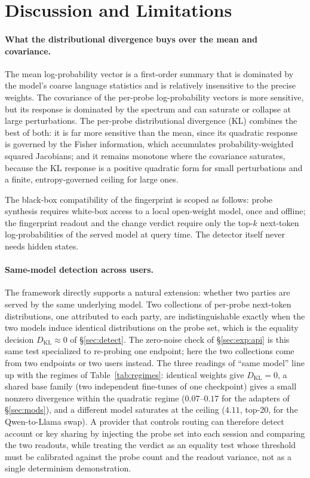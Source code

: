 \documentclass[11pt]{article}
\theoremstyle{definition}
\begin{document}
\section{Discussion and Limitations}
\label{sec:disc}

\paragraph{What the distributional divergence buys over the mean and covariance.}
The mean log-probability vector is a first-order summary that is dominated by
the model's coarse language statistics and is relatively insensitive to the
precise weights. The covariance of the per-probe log-probability vectors is
more sensitive, but its response is dominated by the spectrum and can saturate
or collapse at large perturbations. The per-probe distributional divergence
(KL) combines the best of both: it is far more sensitive than the mean, since its
quadratic response is governed by the Fisher information, which accumulates
probability-weighted squared Jacobians; and it
remains monotone where the covariance saturates, because the KL response is a
positive quadratic form for small perturbations and a finite, entropy-governed
ceiling for large ones.

The black-box compatibility of the fingerprint is scoped as follows: probe
synthesis requires white-box access to a local open-weight model, once and
offline; the fingerprint readout and the change verdict require only the top-$k$
next-token log-probabilities of the served model at query time. The detector
itself never needs hidden states.

\paragraph{Same-model detection across users.}
The framework directly supports a natural extension: whether two parties are
served by the same underlying model. Two collections of per-probe next-token
distributions, one attributed to each party, are indistinguishable exactly when
the two models induce identical distributions on the probe set, which is the
equality decision $D_{\mathrm{KL}} \approx 0$ of \S\ref{sec:detect}. The zero-noise check of
\S\ref{sec:exp:api} is this same test specialized to re-probing one endpoint;
here the two collections come from two endpoints or two users instead. The three
readings of ``same model'' line up with the regimes of
Table~\ref{tab:regimes}: identical weights give $D_{\mathrm{KL}} = 0$, a shared
base family (two independent fine-tunes of one checkpoint) gives a small nonzero
divergence within the quadratic regime ($0.07$--$0.17$ for the adapters of
\S\ref{sec:mods}), and a different model saturates at the ceiling ($4.11$,
top-20, for the Qwen-to-Llama swap). A provider that controls routing can
therefore detect account or key sharing by injecting the probe set into each
session and comparing the two readouts, while treating the verdict as an
equality test whose threshold must be calibrated against the probe count and
the readout variance, not as a single determinism demonstration.
\end{document}
